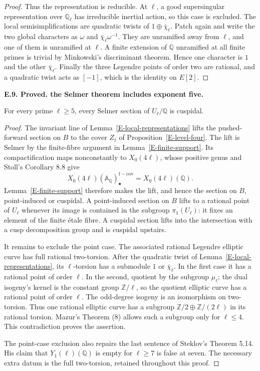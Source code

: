 \documentclass[11pt,oneside]{article}
\makeatletter
\newcounter{statementanchor}
\newenvironment{statement}[3]{%
 \refstepcounter{statementanchor}\def\@currentlabel{#1}%
 \par\addvspace{9pt}\noindent
 \textbf{#1. #2. #3.}\par\nobreak\noindent\ignorespaces
}{\par\addvspace{5pt}}
\makeatother
\begin{document}
\begin{proof}
Thus the representation is reducible.
At $\ell$, a good supersingular representation
over $\mathbb Q_\ell$ has irreducible inertial
action, so this case is excluded. The local
semisimplifications are quadratic twists of
$1\oplus\bar\chi_\ell$. Patch again and write
the two global characters as $\omega$ and
$\bar\chi_\ell\omega^{-1}$.
They are unramified away from $\ell$, and one
of them is unramified at $\ell$. A finite
extension of $\mathbb Q$ unramified at all
finite primes is trivial by Minkowski's
discriminant theorem. Hence one character is
$1$ and the other $\bar\chi_\ell$.
Finally the three Legendre points of order
two are rational, and a quadratic twist acts
as $[-1]$, which is the identity on $E[2]$.
\end{proof}

\begin{statement}{E.9}{Proved}{the Selmer theorem includes exponent five}
\label{st:E.9}
\label{E-selmer-primes}
For every prime $\ell\geq5$, every Selmer section
of $U_\ell/\mathbb Q$ is cuspidal.
\end{statement}
\begin{proof}
The invariant line of Lemma~\ref{E-local-representations}
lifts the pushed-forward section on $B$ to the
cover $Z_\ell$ of Proposition~\ref{E-level-four}.
The lift is Selmer by the finite-fibre argument
in Lemma~\ref{E-finite-support}.
Its compactification maps nonconstantly to
$X_0(4\ell)$, whose positive genus and Stoll's
Corollary 8.8 give
\[
 X_0(4\ell)(\mathbb A_{\mathbb Q})_\bullet^{\mathrm{f-cov}}
        =X_0(4\ell)(\mathbb Q).
\]
Lemma~\ref{E-finite-support} therefore makes the
lift, and hence the section on $B$, point-induced
or cuspidal. A point-induced section on $B$
lifts to a rational point of $U_\ell$ whenever
its image is contained in the subgroup
$\pi_1(U_\ell)$: it fixes an element of the
finite étale fibre. A cuspidal section lifts
into the intersection with a cusp decomposition
group and is cuspidal upstairs.

It remains to exclude the point case.
The associated rational Legendre elliptic
curve has full rational two-torsion.
After the quadratic twist of
Lemma~\ref{E-local-representations}, its
$\ell$-torsion has a submodule $1$ or
$\bar\chi_\ell$. In the first case it has a
rational point of order $\ell$. In the second,
quotient by the subgroup $\mu_\ell$; the
dual isogeny's kernel is the constant group
$\mathbb Z/\ell$, so the quotient elliptic
curve has a rational point of order $\ell$.
The odd-degree isogeny is an isomorphism on
two-torsion. Thus one rational elliptic curve
has a subgroup
$\mathbb Z/2\oplus\mathbb Z/(2\ell)$ in its
rational torsion. Mazur's Theorem (8)
allows such a subgroup only for $\ell\leq4$.
This contradiction proves the assertion.

The point-case exclusion also repairs the
last sentence of Steklov's Theorem 5.14.
His claim that $Y_1(\ell)(\mathbb Q)$ is empty
for $\ell\geq7$ is false at seven.
The necessary extra datum is the full
two-torsion, retained throughout this proof.
\end{proof}
\end{document}
